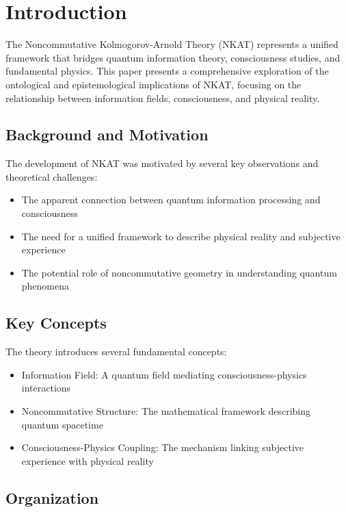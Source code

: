 \section{Introduction}

The Noncommutative Kolmogorov-Arnold Theory (NKAT) represents a unified framework that bridges quantum information theory, consciousness studies, and fundamental physics. This paper presents a comprehensive exploration of the ontological and epistemological implications of NKAT, focusing on the relationship between information fields, consciousness, and physical reality.

\subsection{Background and Motivation}

The development of NKAT was motivated by several key observations and theoretical challenges:

\begin{itemize}
    \item The apparent connection between quantum information processing and consciousness
    \item The need for a unified framework to describe physical reality and subjective experience
    \item The potential role of noncommutative geometry in understanding quantum phenomena
\end{itemize}

\subsection{Key Concepts}

The theory introduces several fundamental concepts:

\begin{itemize}
    \item Information Field: A quantum field mediating consciousness-physics interactions
    \item Noncommutative Structure: The mathematical framework describing quantum spacetime
    \item Consciousness-Physics Coupling: The mechanism linking subjective experience with physical reality
\end{itemize}

\subsection{Organization}

